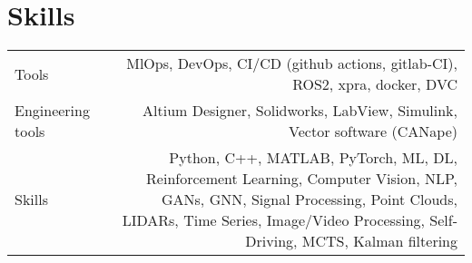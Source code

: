 \section*{\sectionformat Skills}
\begin{tabular}{@{}L!{\VRule}R}
    Tools             & MlOps, DevOps, CI/CD (github actions, gitlab-CI), ROS2, xpra, docker, DVC \\
    Engineering tools & Altium Designer, Solidworks, LabView, Simulink, Vector software (CANape)          \\
    Skills            &  Python, C++, MATLAB, PyTorch, ML, DL, Reinforcement Learning, Computer Vision, NLP, GANs, GNN, Signal Processing, Point Clouds, LIDARs, Time Series, Image/Video Processing,  Self-Driving, MCTS, Kalman filtering
    \\
\end{tabular}